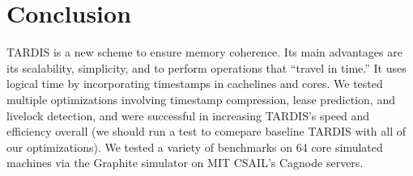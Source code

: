 \documentclass[12pt]{article}
\begin{document}
\section{Conclusion}
	TARDIS is a new scheme to ensure memory coherence. Its main advantages are its scalability, simplicity, and to perform operations that “travel in time.” It uses logical time by incorporating timestamps in cachelines and cores. We tested multiple optimizations involving timestamp compression, lease prediction, and livelock detection, and were successful in increasing TARDIS’s speed and efficiency overall (we should run a test to comepare baseline TARDIS with all of our optimizations). We tested a variety of benchmarks on 64 core simulated machines via the Graphite simulator on MIT CSAIL’s Cagnode servers.

{
	
	
}
\end{document}
